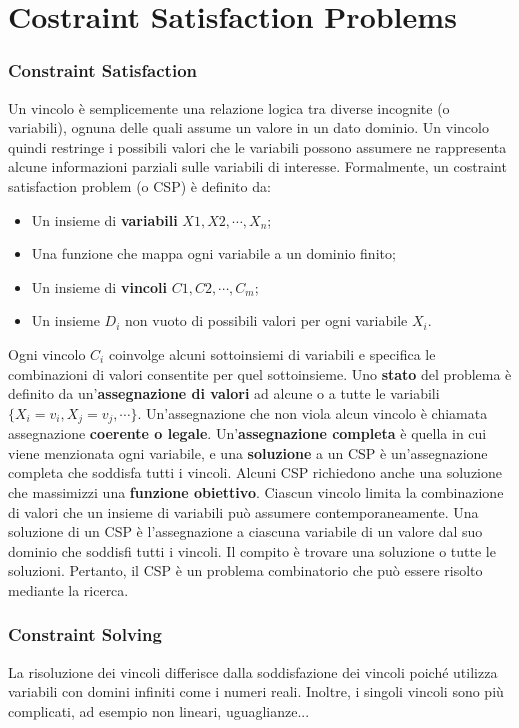 \chapter{Costraint Satisfaction Problems}
\subsection{Constraint Satisfaction}
Un vincolo è semplicemente una relazione logica tra diverse incognite (o variabili), ognuna delle quali assume un valore in un dato dominio. Un vincolo quindi restringe i possibili valori che le variabili possono assumere ne rappresenta alcune informazioni parziali sulle variabili di interesse. Formalmente, un costraint satisfaction problem (o CSP) è definito da:
\begin{itemize}
    \item Un insieme di \textbf{variabili} $X1, X2, \cdots , X_n$;
    \item Una funzione che mappa ogni variabile a un dominio finito;
    \item Un insieme di \textbf{vincoli} $C1, C2, \cdots, C_m$;
    \item Un insieme $D_i$ non vuoto di possibili valori per ogni variabile $X_i$.
\end{itemize}  
 Ogni vincolo $C_i$ coinvolge alcuni sottoinsiemi di variabili e specifica le combinazioni di valori consentite per quel sottoinsieme. Uno \textbf{stato} del problema è definito da un'\textbf{assegnazione di valori} ad alcune o a tutte le variabili $\{ X_i = v_i, X_j = v_j, \cdots\}$. Un'assegnazione che non viola alcun vincolo è chiamata assegnazione \textbf{coerente o legale}. Un'\textbf{assegnazione completa} è quella in cui viene menzionata ogni variabile, e una \textbf{soluzione} a un CSP è un'assegnazione completa che soddisfa tutti i vincoli. Alcuni CSP richiedono anche una soluzione che massimizzi una \textbf{funzione obiettivo}. Ciascun vincolo limita la combinazione di valori che un insieme di variabili può assumere contemporaneamente. Una soluzione di un CSP è l'assegnazione a ciascuna variabile di un valore dal suo dominio che soddisfi tutti i vincoli. Il compito è trovare una soluzione o tutte le soluzioni. Pertanto, il CSP è un problema combinatorio che può essere risolto mediante la ricerca.
\subsection{Constraint Solving} 
La risoluzione dei vincoli differisce dalla soddisfazione dei vincoli poiché utilizza variabili con domini infiniti come i numeri reali. Inoltre, i singoli vincoli sono più complicati, ad esempio non lineari, uguaglianze...

